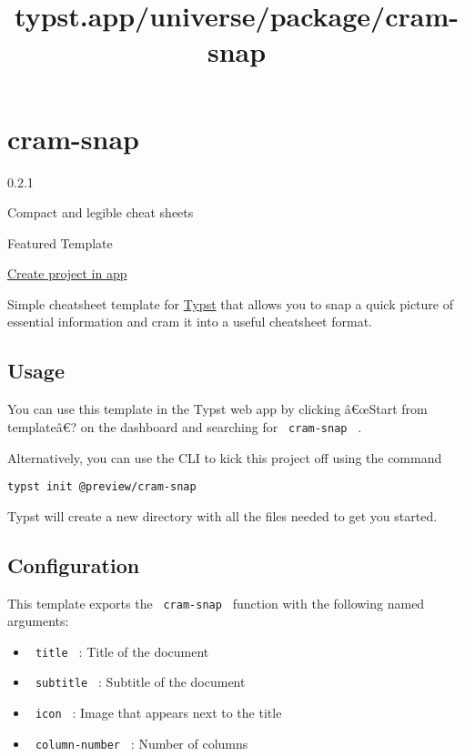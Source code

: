 \title{typst.app/universe/package/cram-snap}

\label{banner}
\label{template-thumbnail}

\section{cram-snap}\label{cram-snap}

{ 0.2.1 }

Compact and legible cheat sheets

{ } Featured Template

\href{/app?template=cram-snap&version=0.2.1}{Create project in app}

\label{readme}
Simple cheatsheet template for \href{https://typst.app/}{Typst} that
allows you to snap a quick picture of essential information and cram it
into a useful cheatsheet format.

\subsection{Usage}\label{usage}

You can use this template in the Typst web app by clicking â€œStart from
templateâ€? on the dashboard and searching for \texttt{\ cram-snap\ } .

Alternatively, you can use the CLI to kick this project off using the
command

\begin{verbatim}
typst init @preview/cram-snap
\end{verbatim}

Typst will create a new directory with all the files needed to get you
started.

\subsection{Configuration}\label{configuration}

This template exports the \texttt{\ cram-snap\ } function with the
following named arguments:

\begin{itemize}
\tightlist
\item
  \texttt{\ title\ } : Title of the document
\item
  \texttt{\ subtitle\ } : Subtitle of the document
\item
  \texttt{\ icon\ } : Image that appears next to the title
\item
  \texttt{\ column-number\ } : Number of columns
\end{itemize}

